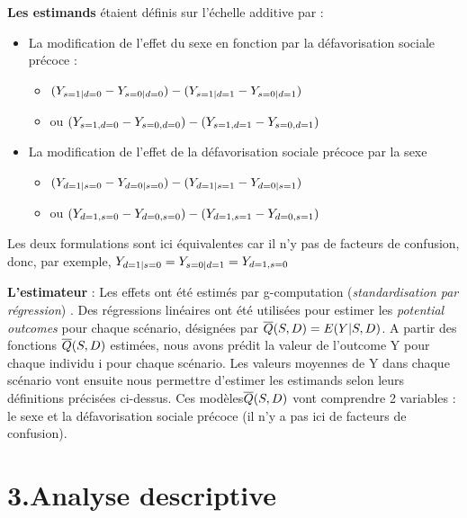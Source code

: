\documentclass[
]{book}
\providecommand{\tightlist}{%
  \setlength{\itemsep}{0pt}\setlength{\parskip}{0pt}}
\begin{document}
\textbf{Les estimands} étaient définis sur l'échelle additive par :

\begin{itemize}
\tightlist
\item
  La modification de l'effet du sexe en fonction par la défavorisation sociale précoce :

  \begin{itemize}
  \tightlist
  \item
    \(\small (Y_{s=1|d=0} - Y_{s=0|d=0}) - (Y_{s=1|d=1} - Y_{s=0|d=1})\)
  \item
    ou \(\small (Y_{s=1,d=0} - Y_{s=0,d=0}) - (Y_{s=1,d=1} - Y_{s=0,d=1})\)
  \end{itemize}
\item
  La modification de l'effet de la défavorisation sociale précoce par la sexe

  \begin{itemize}
  \tightlist
  \item
    \(\small (Y_{d=1|s=0} - Y_{d=0|s=0}) - (Y_{d=1|s=1} - Y_{d=0|s=1})\)
  \item
    ou \(\small (Y_{d=1,s=0} - Y_{d=0,s=0}) - (Y_{d=1,s=1} - Y_{d=0,s=1})\)
  \end{itemize}
\end{itemize}

Les deux formulations sont ici équivalentes car il n'y pas de facteurs de confusion, donc, par exemple, \(\small Y_{d=1|s=0} = Y_{s=0|d=1} = Y_{d=1,s=0}\)

\textbf{L'estimateur} :
Les effets ont été estimés par g-computation (\emph{standardisation par régression}) \citet{hernan2020causal}.
Des régressions linéaires ont été utilisées pour estimer les \emph{potential outcomes} pour chaque scénario, désignées par \(\small \overline{Q}(S, D) = E(Y|S, D)\).
A partir des fonctions \(\small \overline{Q}(S, D)\) estimées, nous avons prédit la valeur de l'outcome Y pour chaque individu i pour chaque scénario. Les valeurs moyennes de Y dans chaque scénario vont ensuite nous permettre d'estimer les estimands selon leurs définitions précisées ci-dessus.
Ces modèles\(\small \overline{Q}(S, D)\) vont comprendre 2 variables : le sexe et la défavorisation sociale précoce (il n'y a pas ici de facteurs de confusion).

\hypertarget{analyse-descriptive}{%
\section{3.Analyse descriptive}\label{analyse-descriptive}}
\end{document}
